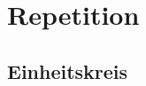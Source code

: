 \documentclass[numerate]{cheatsheet}
\author{Nina Schmidt - nischmidt$@$ethz.ch}
\begin{document}
\renewcommand{\multirowsetup}{\centering} %
\setlength{\tabcolsep}{4pt}
\newcommand{\cbreak}{%
    \vfill\null\columnbreak%
}

\makeatletter
\newcommand{\pushright}[1]{\ifmeasuring@#1\else\omit\hfill$\displaystyle#1$\fi\ignorespaces}
\newcommand{\pushleft}[1]{\ifmeasuring@#1\else\omit$\displaystyle#1$\hfill\fi\ignorespaces}
\makeatother

\def\doubleunderline#1{\underline{\underline{#1}}}

\section{Repetition}
    \subsection{Einheitskreis}    
\end{document}

